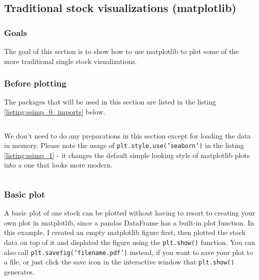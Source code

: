 \documentclass[12pt, a4paper]{article}
\begin{document}
\newpage
\subsection{Traditional stock visualizations (matplotlib)}
\subsubsection{Goals}
The goal of this section is to show how to use matplotlib to plot some of the more traditional single stock visualizations.


\subsubsection{Before plotting}

The packages that will be used in this section are listed in the listing \ref{listing:ssimp_0_imports} below.

\bgroup
  \inputminted[linenos, breaklines=true, fontsize=\scriptsize]{python}{src/stocks/simple/0_imports.py}
  \label{listing:ssimp_0_imports}
\egroup


We don't need to do any preparations in this section except for loading the data in memory. Please note the usage of \texttt{plt.style.use('seaborn')} in the listing \ref{listing:ssimp_1} - it changes the default simple looking style of matplotlib plots into a one that looks more modern.

\bgroup
  \inputminted[linenos, breaklines=true, fontsize=\scriptsize, firstnumber=last]{python}{src/stocks/simple/1_get_data.py}
  \label{listing:ssimp_1}
\egroup

\subsubsection{Basic plot}

A basic plot of one stock can be plotted without having to resort to creating your own plot in matplotlib, since a pandas DataFrame has a built-in plot function. In this example, I created an empty matplotlib figure first, then plotted the stock data on top of it and displated the figure using the \texttt{plt.show()} function. You can also call \texttt{plt.savefig('filename.pdf')} instead, if you want to save your plot to a file, or just click the save icon in the interactive window that \texttt{plt.show()} generates.
\end{document}
